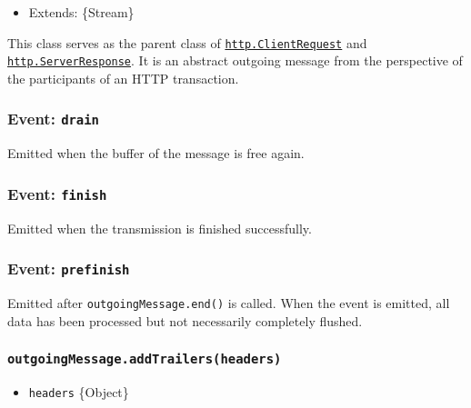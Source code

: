 \begin{itemize}
\tightlist
\item
  Extends: \{Stream\}
\end{itemize}

This class serves as the parent class of
\hyperref[class-httpclientrequest]{\texttt{http.ClientRequest}} and
\hyperref[class-httpserverresponse]{\texttt{http.ServerResponse}}. It is
an abstract outgoing message from the perspective of the participants of
an HTTP transaction.

\subsubsection{\texorpdfstring{Event:
\texttt{\textquotesingle{}drain\textquotesingle{}}}{Event: \textquotesingle drain\textquotesingle{}}}\label{event-drain}

Emitted when the buffer of the message is free again.

\subsubsection{\texorpdfstring{Event:
\texttt{\textquotesingle{}finish\textquotesingle{}}}{Event: \textquotesingle finish\textquotesingle{}}}\label{event-finish-2}

Emitted when the transmission is finished successfully.

\subsubsection{\texorpdfstring{Event:
\texttt{\textquotesingle{}prefinish\textquotesingle{}}}{Event: \textquotesingle prefinish\textquotesingle{}}}\label{event-prefinish}

Emitted after \texttt{outgoingMessage.end()} is called. When the event
is emitted, all data has been processed but not necessarily completely
flushed.

\subsubsection{\texorpdfstring{\texttt{outgoingMessage.addTrailers(headers)}}{outgoingMessage.addTrailers(headers)}}\label{outgoingmessage.addtrailersheaders}

\begin{itemize}
\tightlist
\item
  \texttt{headers} \{Object\}
\end{itemize}

